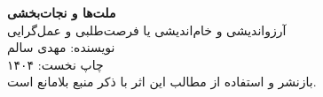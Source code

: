 \thispagestyle{empty}
\vspace*{\fill}
\begin{center}
  {\large\bfseries ملت‌ها و نجات‌بخشی}\\[6pt]
  {\normalsize آرزواندیشی و خام‌اندیشی یا فرصت‌طلبی و عمل‌گرایی}\\[18pt]
  {\normalsize نویسنده: مهدی سالم}\\[12pt]
  {\small چاپ نخست: ۱۴۰۴}\\[20pt]
{\small\color{NeutralDark}
	بازنشر و استفاده از مطالب این اثر با ذکر منبع بلامانع است.}

\end{center}
\vspace*{\fill}
\cleardoublepage